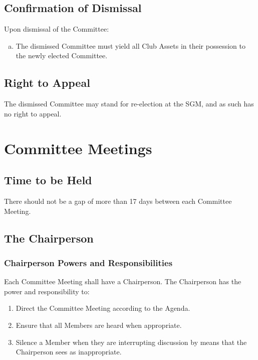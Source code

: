 \documentclass[a4paper,12pt]{article}
\begin{document}
\subsection{Confirmation of Dismissal}

Upon dismissal of the Committee:

\begin{enumerate}[a)]
	\item The dismissed Committee must yield all Club Assets in their possession to the newly elected Committee.
\end{enumerate}

\subsection{Right to Appeal}

The dismissed Committee may stand for re-election at the SGM, and as such has no right to appeal.

\section{Committee Meetings}

\subsection{Time to be Held}

There should not be a gap of more than 17 days between each Committee Meeting.

\subsection{The Chairperson}

\subsubsection{Chairperson Powers and Responsibilities}

Each Committee Meeting shall have a Chairperson. The Chairperson has the power and responsibility to:

\begin{enumerate}
	\item Direct the Committee Meeting according to the Agenda.
	\item Ensure that all Members are heard when appropriate.
	\item Silence a Member when they are interrupting discussion by means that the Chairperson sees as inappropriate.
\end{enumerate}
\end{document}
